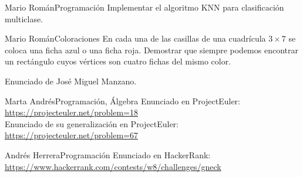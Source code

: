 \documentclass[a4paper, 11pt]{article} %
\numberwithin{prbcounter}{section}
\begin{document}
  \begin{enunciado}{Mario Román}{Programación}
    Implementar el algoritmo KNN para clasificación multiclase.
  \end{enunciado}

  \begin{enunciado}{Mario Román}{Coloraciones}
   En cada una de las casillas de una cuadrícula $3 \times 7$ se coloca una ficha azul o una ficha roja.
   Demostrar que siempre podemos encontrar un rectángulo cuyos vértices son cuatro fichas del mismo
   color.
   
   Enunciado de José Miguel Manzano. 
  \end{enunciado}

  \begin{enunciado}{Marta Andrés}{Programación, Álgebra}
   Enunciado en ProjectEuler: \url{https://projecteuler.net/problem=18} \\
   Enunciado de su generalización en ProjectEuler: \url{https://projecteuler.net/problem=67}
  \end{enunciado}
  
  
  \begin{enunciado}{Andrés Herrera}{Programación}
    Enunciado en HackerRank: \url{https://www.hackerrank.com/contests/w8/challenges/gneck}
  \end{enunciado}

  
\end{document}
